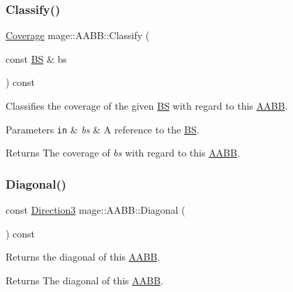 \subsubsection{\texorpdfstring{Classify()}{Classify()}\hspace{0.1cm}{\footnotesize\ttfamily [4/4]}}
{\footnotesize\ttfamily \hyperlink{namespacemage_aa9fe157e5a578a103160266df8cccb0a}{Coverage} mage\+::\+A\+A\+B\+B\+::\+Classify (\begin{DoxyParamCaption}\item[{const \hyperlink{structmage_1_1_b_s}{BS} \&}]{bs }\end{DoxyParamCaption}) const\hspace{0.3cm}{\ttfamily [noexcept]}}

Classifies the coverage of the given \hyperlink{structmage_1_1_b_s}{BS} with regard to this \hyperlink{structmage_1_1_a_a_b_b}{A\+A\+BB}.


\begin{DoxyParams}[1]{Parameters}
\mbox{\tt in}  & {\em bs} & A reference to the \hyperlink{structmage_1_1_b_s}{BS}. \\
\hline
\end{DoxyParams}
\begin{DoxyReturn}{Returns}
The coverage of {\itshape bs} with regard to this \hyperlink{structmage_1_1_a_a_b_b}{A\+A\+BB}. 
\end{DoxyReturn}
\hypertarget{structmage_1_1_a_a_b_b_a9b9611522d1f5dd03e3c1787f8706b3d}{}\label{structmage_1_1_a_a_b_b_a9b9611522d1f5dd03e3c1787f8706b3d} 
\subsubsection{\texorpdfstring{Diagonal()}{Diagonal()}}
{\footnotesize\ttfamily const \hyperlink{structmage_1_1_direction3}{Direction3} mage\+::\+A\+A\+B\+B\+::\+Diagonal (\begin{DoxyParamCaption}{ }\end{DoxyParamCaption}) const\hspace{0.3cm}{\ttfamily [noexcept]}}

Returns the diagonal of this \hyperlink{structmage_1_1_a_a_b_b}{A\+A\+BB}.

\begin{DoxyReturn}{Returns}
The diagonal of this \hyperlink{structmage_1_1_a_a_b_b}{A\+A\+BB}. 
\end{DoxyReturn}
\hypertarget{structmage_1_1_a_a_b_b_a308fce591178a9aeaed3838dfa32972f}{}\label{structmage_1_1_a_a_b_b_a308fce591178a9aeaed3838dfa32972f} 
